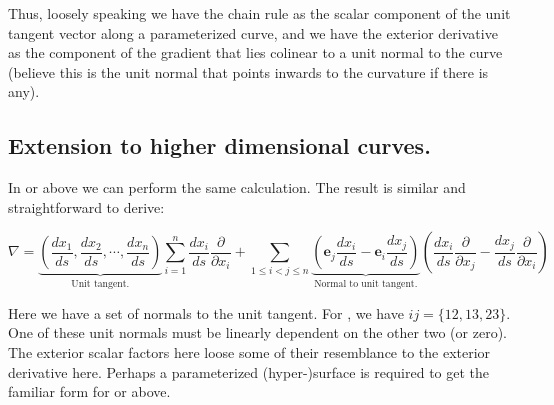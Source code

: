 \documentclass{article}      %
\begin{document}
Thus, loosely speaking we have the chain rule as the scalar component of the unit tangent vector along a parameterized curve,
and we have the exterior derivative as the component of the gradient that lies colinear to a unit normal to the curve (believe this
is the unit normal that points inwards to the curvature if there is any).

\subsection{ Extension to higher dimensional curves. }

In  or above we can perform the same calculation.  The result is similar and straightforward to derive:

\begin{equation}
\nabla
=
\underbrace{
\left(\frac{dx_1}{ds}, \frac{dx_2}{ds}, \cdots, \frac{dx_n}{ds}\right)
 }_{\text{Unit tangent.} }
\sum_{i=1}^n \frac{dx_i}{ds}\frac{\partial}{\partial x_i}
+ \sum_{1 \le i < j \le n} 
\underbrace{
\left(
\mathbf{e}_j \frac{dx_i}{ds}
-\mathbf{e}_i \frac{dx_j}{ds}
\right)
}_{\text{ Normal to unit tangent. }}
\left(
\frac{dx_i}{ds}\frac{\partial}{\partial x_j}
-\frac{dx_j}{ds}\frac{\partial}{\partial x_i}
\right)
\end{equation}

Here we have a set of normals to the unit tangent.  For , we have $ij=\{12,13,23\}$.  One of these unit normals must
be linearly dependent on the other two (or zero).  The exterior scalar factors here loose some of their resemblance to the
exterior derivative here.  Perhaps a parameterized (hyper-)surface is required to get the familiar form for  or above.
\end{document}
